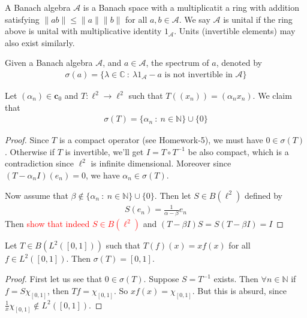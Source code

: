 

\begin{definition}
  A Banach algebra $\mathcal{A}$ is a Banach space with a
  multiplicatit a ring with addition satisfying $\|ab\| \le
  \|a\|\|b\|$ for all $ a, b \in \mathcal{A}$. We say $\mathcal{A}$
  is unital if the ring above is unital with multiplicative identity
  $1_{\mathcal{A}}$. Units (invertible elements)
  may also exist similarly.
\end{definition}

\begin{definition}
  Given a Banach algebra $\mathcal{A}$, and $a \in \mathcal{A}$, the
  spectrum of $a$, denoted by
  \begin{align*}
    \sigma(a) = \{ \lambda \in \mathbb{C}  \ : \  \lambda
    1_{\mathcal{A}} - a \textrm{ is not invertible in } \mathcal{A} \}
  \end{align*}
\end{definition}

\begin{example}
  Let $(\alpha_n) \in \textbf{c}_0$ and $T: \ell^{2} \to \ell^{2}$
  such that $T((x_n)) = (\alpha_n x_n)$. We claim that
  \begin{align*}
    \sigma(T) = \{ \alpha_n  \ : \  n \in \mathbb{N} \} \cup \{ 0 \}
  \end{align*}
\end{example}
\begin{proof}
  Since $T$ is a compact operator (see Homework-5), we must have $0
  \in \sigma(T)$. Otherwise if $T$ is invertible, we'll get $I  = T
  \circ T^{-1}$ be also compact, which is a contradiction since
  $\ell^{2}$ is infinite dimensional. Moreover since $(T - \alpha_n I
  )(e_n) = 0$, we have $ \alpha_n \in \sigma(T)$.

  Now assume that $\beta \notin \{ \alpha_n  \ : \  n \in \mathbb{N}
  \} \cup \{ 0 \}$. Then let $S \in B(\ell^{2})$ defined by
  \begin{align*}
    S(e_n) = \frac{1}{\alpha-\beta} e_n
  \end{align*}
  Then \textcolor{red}{show that indeed $S \in B(\ell^{2})$} and $(T
  - \beta I)S = S(T - \beta I) = I$
\end{proof}

\begin{example}
  Let $T \in B(L^{2}([0, 1]))$ such that $T(f)(x) = xf(x)$ for all $
  f \in L^{2}([0, 1])$. Then $  \sigma(T) = [0, 1]$.
\end{example}
\begin{proof}
  First let us see that $0 \in \sigma(T)$. Suppose $  S = T^{-1}$
  exists. Then $\forall n \in \mathbb{N}$ if $ f = S \chi_{[0, 1]}$,
  then $Tf = \chi_{[0, 1]}$. So $x f(x) =
  \chi_{[0, 1]}$. But this is absurd, since $\frac{1}{x} \chi_{[0,
  1]} \notin L^2([0, 1])$.
\end{proof}

